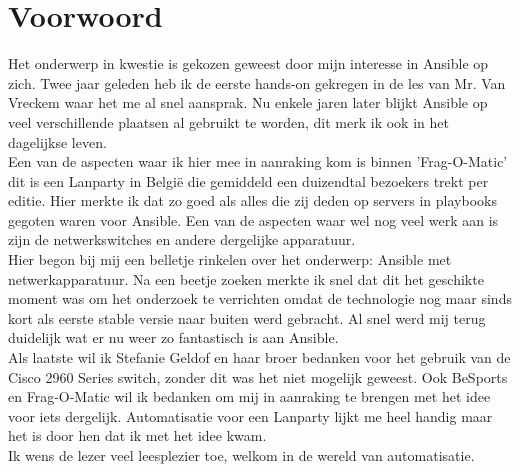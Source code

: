 
\chapter*{Voorwoord}
\label{ch:voorwoord}


Het onderwerp in kwestie is gekozen geweest door mijn interesse in Ansible op zich. Twee jaar geleden heb ik de eerste hands-on gekregen in de les van Mr. Van Vreckem waar het me al snel aansprak. Nu enkele jaren later blijkt Ansible op veel verschillende plaatsen al gebruikt te worden, dit merk ik ook in het dagelijkse leven. 
\\

Een van de aspecten waar ik hier mee in aanraking kom is binnen 'Frag-O-Matic' dit is een Lanparty in België die gemiddeld een duizendtal bezoekers trekt per editie. Hier merkte ik dat zo goed als alles die zij deden op servers in playbooks gegoten waren voor Ansible. Een van de aspecten waar wel nog veel werk aan is zijn de netwerkswitches en andere dergelijke apparatuur. 
\\
Hier begon bij mij een belletje rinkelen over het onderwerp: Ansible met netwerkapparatuur. Na een beetje zoeken merkte ik snel dat dit het geschikte moment was om het onderzoek te verrichten omdat de technologie nog maar sinds kort als eerste stable versie naar buiten werd gebracht. Al snel werd mij terug duidelijk wat er nu weer zo fantastisch is aan Ansible.
\\

Als laatste wil ik Stefanie Geldof en haar broer bedanken voor het gebruik van de Cisco 2960 Series switch, zonder dit was het niet mogelijk geweest. 
Ook BeSports en Frag-O-Matic wil ik bedanken om mij in aanraking te brengen met het idee voor iets dergelijk. Automatisatie voor een Lanparty lijkt me heel handig maar het is door hen dat ik met het idee kwam.
\\

Ik wens de lezer veel leesplezier toe, welkom in de wereld van automatisatie.